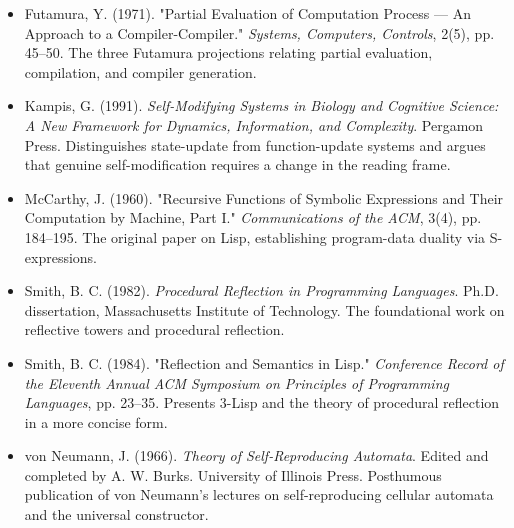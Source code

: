 \begin{itemize}
  \item Futamura, Y. (1971). "Partial Evaluation of Computation Process --- An Approach to a Compiler-Compiler." \textit{Systems, Computers, Controls}, 2(5), pp. 45--50. The three Futamura projections relating partial evaluation, compilation, and compiler generation.
\end{itemize}

\begin{itemize}
  \item Kampis, G. (1991). \textit{Self-Modifying Systems in Biology and Cognitive Science: A New Framework for Dynamics, Information, and Complexity}. Pergamon Press. Distinguishes state-update from function-update systems and argues that genuine self-modification requires a change in the reading frame.
\end{itemize}

\begin{itemize}
  \item McCarthy, J. (1960). "Recursive Functions of Symbolic Expressions and Their Computation by Machine, Part I." \textit{Communications of the ACM}, 3(4), pp. 184--195. The original paper on Lisp, establishing program-data duality via S-expressions.
\end{itemize}

\begin{itemize}
  \item Smith, B. C. (1982). \textit{Procedural Reflection in Programming Languages}. Ph.D. dissertation, Massachusetts Institute of Technology. The foundational work on reflective towers and procedural reflection.
\end{itemize}

\begin{itemize}
  \item Smith, B. C. (1984). "Reflection and Semantics in Lisp." \textit{Conference Record of the Eleventh Annual ACM Symposium on Principles of Programming Languages}, pp. 23--35. Presents 3-Lisp and the theory of procedural reflection in a more concise form.
\end{itemize}

\begin{itemize}
  \item von Neumann, J. (1966). \textit{Theory of Self-Reproducing Automata}. Edited and completed by A. W. Burks. University of Illinois Press. Posthumous publication of von Neumann's lectures on self-reproducing cellular automata and the universal constructor.
\end{itemize}

